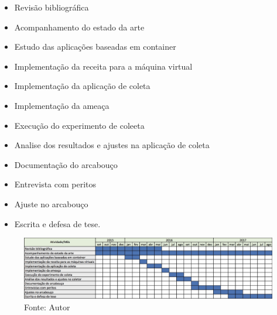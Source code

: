 \documentclass[12pt,				%
	openright,			%
	oneside,			%
	a4paper,			%
	english,			%
	brazil				%
	]{abntex2}
\begin{document}
\begin{itemize}
 \item Revisão bibliográfica
 \item Acompanhamento do estado da arte
 \item Estudo das aplicações baseadas em container
 \item Implementação da receita para a máquina virtual
 \item Implementação da aplicação de coleta
 \item Implementação da ameaça
 \item Execução do experimento de coleeta
 \item Analise dos resultados e ajustes na aplicação de coleta
 \item Documentação do arcabouço
 \item Entrevista com peritos
 \item Ajuste no arcabouço
 \item Escrita e defesa de tese.
\end{itemize}

\begin{figure}
\includegraphics[keepaspectratio, scale=0.26]{Cronograma}
\caption{Fonte: Autor}
\end{figure}



\postextual

%  

\end{document}
